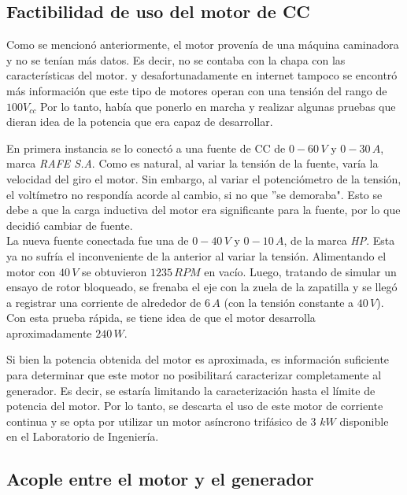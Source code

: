 \documentclass[a4paper,11pt,twoside]{IT-CNEA}
\begin{document}
\subsection{Factibilidad de uso del motor de CC}
Como se mencionó anteriormente, el motor provenía de una máquina caminadora y no se tenían más datos. Es decir, no se contaba con la chapa con las características del motor. y desafortunadamente en internet tampoco se encontró más información que este tipo de motores operan con una tensión del rango de $100V_{cc}$
Por lo tanto, había que ponerlo en marcha y realizar algunas pruebas que dieran idea de la potencia que era capaz de desarrollar. 
\par En primera instancia se lo conectó a una fuente de CC de $0-60\,V$ y $0-30\,A$, marca \textit{RAFE S.A}. Como es natural, al variar la tensión de la fuente, varía la velocidad del giro el motor. Sin embargo, al variar el potenciómetro de la tensión, el voltímetro no respondía acorde al cambio, si no que ''se demoraba". Esto se debe a que la carga inductiva del motor era significante para la fuente, por lo que decidió cambiar de fuente.
\\La nueva fuente conectada fue una de $0-40\,V$ y $0-10\,A$, de la marca \textit{HP}. Esta ya no sufría el inconveniente de la anterior al variar la tensión. Alimentando el motor con $40\,V$ se obtuvieron $1235\,RPM$ en vacío. Luego, tratando de simular un ensayo de rotor bloqueado, se frenaba el eje con la zuela de la zapatilla y se llegó a registrar una corriente de alrededor de $6\,A$ (con la tensión constante a $40\,V$). Con esta prueba rápida, se tiene  idea de que el motor desarrolla aproximadamente $240\,W$.
\par Si bien la potencia obtenida del motor es aproximada, es información suficiente para determinar que este motor no posibilitará caracterizar completamente al generador. Es decir, se estaría limitando la caracterización hasta el límite de potencia del motor. Por lo tanto, se descarta el uso de este motor de corriente continua y se opta por utilizar un motor asíncrono trifásico de 3 $kW$ disponible en el Laboratorio de Ingeniería. 
\subsection{Acople entre el motor y el generador}
\end{document}
